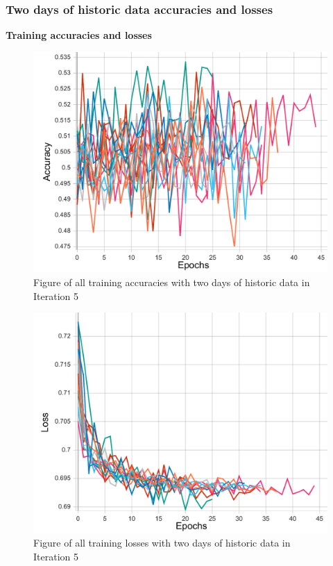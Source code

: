 \subsubsection{Two days of historic data accuracies and losses}
\textbf{Training accuracies and losses}
\begin{figure}[ht]
    \centering
    \includegraphics[width=0.575\columnwidth]{figures/results/final/two_days_acc_t.pdf}
    \caption[Training accuracies for Iteration 5 with two days of historic data]{Figure of all training accuracies with two days of historic data in Iteration 5}
    \label{fig:iteration5_two_days_train_accuracy}
\end{figure}
\FloatBarrier

\begin{figure}[ht]
    \centering
    \includegraphics[width=0.575\columnwidth]{figures/results/final/two_days_loss_t.pdf}
    \caption[Training losses for Iteration 5 with two days of historic data]{Figure of all training losses with two days of historic data in Iteration 5}
    \label{fig:iteration5_two_days_train_loss}
\end{figure}
\FloatBarrier

